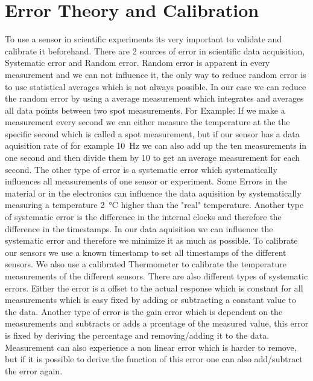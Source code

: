 \section{Error Theory and Calibration}
To use a sensor in scientific experiments its very important to validate and calibrate it beforehand.
There are 2 sources of error in scientific data acquisition, Systematic error and Random error.
Random error is apparent in every measurement and we can not influence it, the only way to reduce random error is to use statistical averages which is not always possible. In our case we can reduce the random error by using a average measurement which integrates and averages all data points between two spot measurements.
For Example: If we make a measurement every second we can either measure the temperature at the the specific second which is called a spot measurement, but if our sensor has a data aquisition rate of for example \SI{10}{\hertz} we can also add up the ten measurements in one second and then divide them by 10 to get an average measurement for each second.
The other type of error is a systematic error which systematically influences all measurements of one sensor or experiment.
Some Errors in the material or in the electronics can influence the data aquisition by systematically measuring a temperature \SI{2}{\celsius} higher than the "real" temperature.
Another type of systematic error is the difference in the internal clocks and therefore the difference in the timestamps.
In our data aquisition we can influence the systematic error and therefore we minimize it as much as possible.
To calibrate our sensors we use a known timestamp to set all timestamps of the different sensors.
We also use a calibrated Thermometer to calibrate the temperature measurements of the different sensors.
There are also different types of systematic errors.
Either the error is a offset to the actual response which is constant for all measurements which is easy fixed by adding or subtracting a constant value to the data.
Another type of error is the gain error which is dependent on the measurements and subtracts or adds a prcentage of the measured value, this error is fixed by deriving the percentage and removing/adding it to the data.
Measurement can also experience a non linear error which is harder to remove, but if it is possible to derive the function of this error one can also add/subtract the error again.